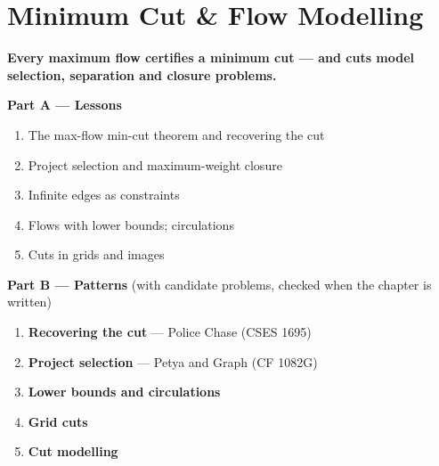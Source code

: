 \chapter{Minimum Cut \& Flow Modelling}
\label{ch:min_cut}

\begin{tcolorbox}[enhanced, colback=white, colframe=secondaryblue, boxrule=1pt, arc=2mm]
\textbf{\large\textcolor{primaryblue}{Every maximum flow certifies a minimum cut --- and cuts model selection, separation and closure problems.}}
\end{tcolorbox}


\begin{plannedbox}
\textbf{Part A --- Lessons}
\begin{enumerate}[leftmargin=*, label=\textbf{A\arabic*.}, itemsep=1pt]
    \item The max-flow min-cut theorem and recovering the cut
    \item Project selection and maximum-weight closure
    \item Infinite edges as constraints
    \item Flows with lower bounds; circulations
    \item Cuts in grids and images
\end{enumerate}
\textbf{Part B --- Patterns} (with candidate problems, checked when the chapter is written)
\begin{enumerate}[leftmargin=*, label=\textbf{P\arabic*.}, itemsep=1pt]
    \item \textbf{Recovering the cut} --- Police Chase {\small\color{darkgray}(CSES 1695)}
    \item \textbf{Project selection} --- Petya and Graph {\small\color{darkgray}(CF 1082G)}
    \item \textbf{Lower bounds and circulations}
    \item \textbf{Grid cuts}
    \item \textbf{Cut modelling}
\end{enumerate}
\end{plannedbox}
